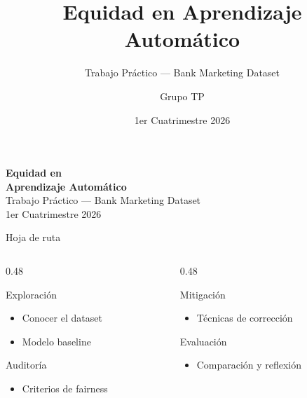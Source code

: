 \documentclass[aspectratio=169, 11pt]{beamer}
\title[Equidad en ML]{Equidad en Aprendizaje Automático}
\subtitle{Trabajo Práctico — Bank Marketing Dataset}
\author{Grupo TP}
\date{1er Cuatrimestre 2026}
\institute{Equidad en Aprendizaje Automático}
\begin{document}
{
\begin{frame}[plain]
\vfill
\begin{center}
{\color{white}\Huge\bfseries Equidad en\\Aprendizaje Automático}\\[12pt]
{\color{azulclaro}\large Trabajo Práctico — Bank Marketing Dataset}\\[24pt]
{\color{gris30}\normalsize 1er Cuatrimestre 2026}\\[6pt]
\end{center}
\vfill
\end{frame}
}

\begin{frame}{Hoja de ruta}
\begin{columns}[T]
\begin{column}{0.48\textwidth}
\begin{block}{\faSearch\quad Exploración}
\begin{itemize}
\item[\textbf{Ej1}] Conocer el dataset
\item[\textbf{Ej2}] Modelo baseline
\end{itemize}
\end{block}
\vspace{4pt}
\begin{block}{\faBalanceScale\quad Auditoría}
\begin{itemize}
\item[\textbf{Ej3}] Criterios de fairness
\end{itemize}
\end{block}
\end{column}
\begin{column}{0.48\textwidth}
\begin{block}{\faWrench\quad Mitigación}
\begin{itemize}
\item[\textbf{Ej4}] Técnicas de corrección
\end{itemize}
\end{block}
\vspace{4pt}
\begin{block}{\faChartBar\quad Evaluación}
\begin{itemize}
\item[\textbf{Ej5}] Comparación y reflexión
\end{itemize}
\end{block}
\end{column}
\end{columns}
\end{frame}
\end{document}
